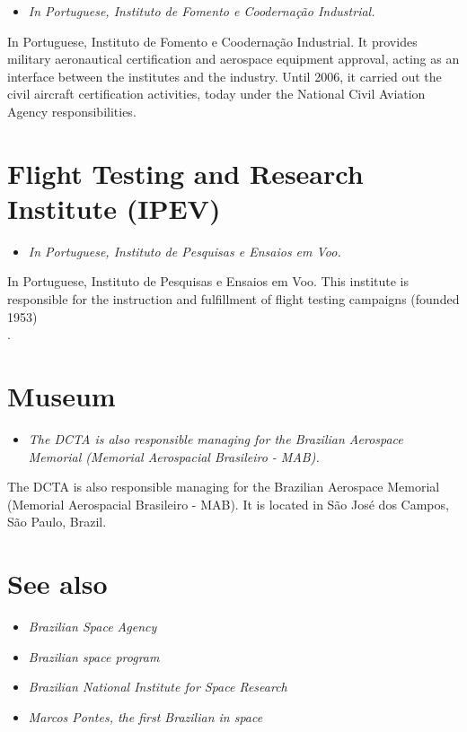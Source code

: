 \begin{itemize}
\item
  \emph{In Portuguese, Instituto de Fomento e Coodernação Industrial.}
\end{itemize}

In Portuguese, Instituto de Fomento e Coodernação Industrial. It
provides military aeronautical certification and aerospace equipment
approval, acting as an interface between the institutes and the
industry. Until 2006, it carried out the civil aircraft certification
activities, today under the National Civil Aviation Agency
responsibilities.

\section{Flight Testing and Research Institute
(IPEV)}\label{flight-testing-and-research-institute-ipev}

\begin{itemize}
\item
  \emph{In Portuguese, Instituto de Pesquisas e Ensaios em Voo.}
\end{itemize}

In Portuguese, Instituto de Pesquisas e Ensaios em Voo. This institute
is responsible for the instruction and fulfillment of flight testing
campaigns (founded 1953)\\
.

\section{Museum}\label{museum}

\begin{itemize}
\item
  \emph{The DCTA is also responsible managing for the Brazilian
  Aerospace Memorial (Memorial Aerospacial Brasileiro - MAB).}
\end{itemize}

The DCTA is also responsible managing for the Brazilian Aerospace
Memorial (Memorial Aerospacial Brasileiro - MAB). It is located in São
José dos Campos, São Paulo, Brazil.

\section{See also}\label{see-also}

\begin{itemize}
\item
  \emph{Brazilian Space Agency}
\item
  \emph{Brazilian space program}
\item
  \emph{Brazilian National Institute for Space Research}
\item
  \emph{Marcos Pontes, the first Brazilian in space}
\end{itemize}

